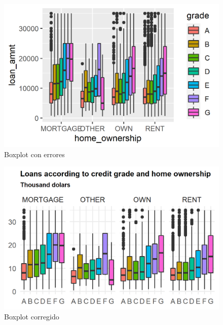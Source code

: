 \documentclass[10.5pt]{article}   %
\begin{document}
\begin{figure}[H]
\centering
\includegraphics[scale=1.2]{imgs/loans1.png}
\caption{Boxplot con errores}
    \label{fig5}
\end{figure}

\begin{figure}[H]
\centering
\includegraphics[scale=1.2]{imgs/loans2.png}
\caption{Boxplot corregido}
    \label{fig6}
\end{figure}
\end{document}
